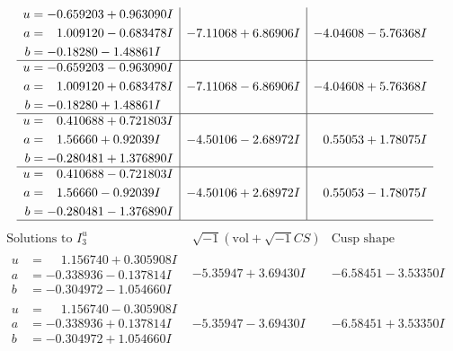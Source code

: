 \documentclass[1p]{elsarticle_modified}
\theoremstyle{definition}
\newcommand{\I}{\sqrt{-1}}
\begin{document}
$$\begin{array}{c|c|c}
\begin{aligned}
u &= -0.659203 + 0.963090 I \\
a &= \phantom{-}1.009120 - 0.683478 I \\
b &= -0.18280 - 1.48861 I\end{aligned}
 & -7.11068 + 6.86906 I & -4.04608 - 5.76368 I \\ \hline\begin{aligned}
u &= -0.659203 - 0.963090 I \\
a &= \phantom{-}1.009120 + 0.683478 I \\
b &= -0.18280 + 1.48861 I\end{aligned}
 & -7.11068 - 6.86906 I & -4.04608 + 5.76368 I \\ \hline\begin{aligned}
u &= \phantom{-}0.410688 + 0.721803 I \\
a &= \phantom{-}1.56660 + 0.92039 I \\
b &= -0.280481 + 1.376890 I\end{aligned}
 & -4.50106 - 2.68972 I & \phantom{-}0.55053 + 1.78075 I \\ \hline\begin{aligned}
u &= \phantom{-}0.410688 - 0.721803 I \\
a &= \phantom{-}1.56660 - 0.92039 I \\
b &= -0.280481 - 1.376890 I\end{aligned}
 & -4.50106 + 2.68972 I & \phantom{-}0.55053 - 1.78075 I\\
 \hline 
 \end{array}$$\newpage$$\begin{array}{c|c|c}  
\text{Solutions to }I^u_{3}& \I (\text{vol} + \sqrt{-1}CS) & \text{Cusp shape}\\
 \hline 
\begin{aligned}
u &= \phantom{-}1.156740 + 0.305908 I \\
a &= -0.338936 - 0.137814 I \\
b &= -0.304972 - 1.054660 I\end{aligned}
 & -5.35947 + 3.69430 I & -6.58451 - 3.53350 I \\ \hline\begin{aligned}
u &= \phantom{-}1.156740 - 0.305908 I \\
a &= -0.338936 + 0.137814 I \\
b &= -0.304972 + 1.054660 I\end{aligned}
 & -5.35947 - 3.69430 I & -6.58451 + 3.53350 I \\ \hline\begin{aligned}

\end{aligned}
\end{array}$$
\end{document}
